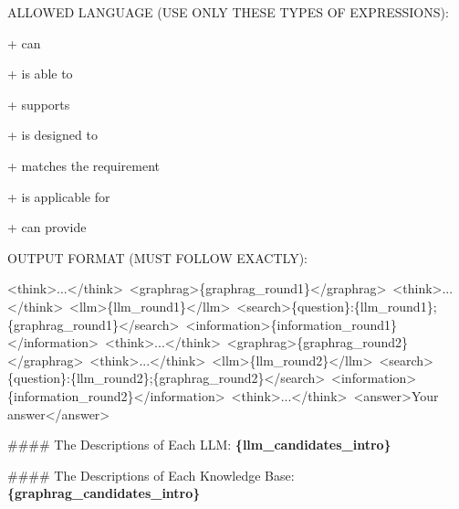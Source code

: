 \begin{tcolorbox}[
    mygreenbox,
    enhanced jigsaw,
    width=\textwidth,
    notitle,
    before upper={
        \setlength{\parindent}{0pt}
        \setlength{\parskip}{0pt}
    }
]
\medskip
ALLOWED LANGUAGE (USE ONLY THESE TYPES OF EXPRESSIONS):\par\noindent
+ can\par\noindent
+ is able to\par\noindent
+ supports\par\noindent
+ is designed to\par\noindent
+ matches the requirement\par\noindent
+ is applicable for\par\noindent
+ can provide\par\noindent

\medskip
OUTPUT FORMAT (MUST FOLLOW EXACTLY):\par\noindent
{\ttfamily\raggedright\noindent
<think>...</think>\,\allowbreak
<graphrag>\{graphrag\_round1\}</graphrag>\,\allowbreak
<think>...</think>\,\allowbreak
<llm>\{llm\_round1\}</llm>\,\allowbreak
<search>\{question\}:\{llm\_round1\};\{graphrag\_round1\}</search>\,\allowbreak
<information>\{information\_round1\}</information>\,\allowbreak
<think>...</think>\,\allowbreak
<graphrag>\{graphrag\_round2\}</graphrag>\,\allowbreak
<think>...</think>\,\allowbreak
<llm>\{llm\_round2\}</llm>\,\allowbreak
<search>\{question\}:\{llm\_round2\};\{graphrag\_round2\}</search>\,\allowbreak
<information>\{information\_round2\}</information>\,\allowbreak
<think>...</think>\,\allowbreak
<answer>Your answer</answer>\par
}

\medskip
\noindent \#\#\#\# The Descriptions of Each LLM: \textbf{\textcolor{myblue}{\{llm\_candidates\_intro\}}}\par\noindent

\medskip
\noindent \#\#\#\# The Descriptions of Each Knowledge Base: \textbf{\textcolor{myblue}{\{graphrag\_candidates\_intro\}}}\par\noindent


\end{tcolorbox}
\label{fig:self-reflection-prompt}








